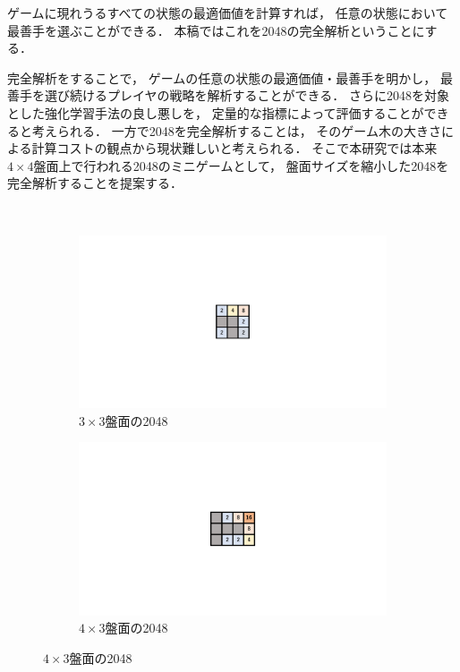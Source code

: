 ゲームに現れうるすべての状態の最適価値を計算すれば， 任意の状態において最善手を選ぶことができる．
本稿ではこれを2048の完全解析ということにする．

完全解析をすることで， ゲームの任意の状態の最適価値・最善手を明かし， 最善手を選び続けるプレイヤの戦略を解析することができる．
さらに2048を対象とした強化学習手法の良し悪しを， 定量的な指標によって評価することができると考えられる．
一方で2048を完全解析することは， そのゲーム木の大きさによる計算コストの観点から現状難しいと考えられる．
そこで本研究では本来$4\times4$盤面上で行われる2048のミニゲームとして， 盤面サイズを縮小した2048を完全解析することを提案する．
\begin{figure}　
\centering
\begin{subfigure}[T]{0.2\columnwidth}
    \centering
    \includegraphics[width=\columnwidth]{figures/mini2048.pdf}
    \caption{$3\times3$盤面の2048}
    \label{fig:mini2048}
\end{subfigure}
\hspace{1cm}
\begin{subfigure}[T]{0.25\columnwidth}
    \centering
    \includegraphics[width=\columnwidth]{figures/mid2048.pdf}
    \caption{$4\times3$盤面の2048}
    \label{fig:mid2048}
\end{subfigure}
\label{fig:minigames}
\end{figure}

